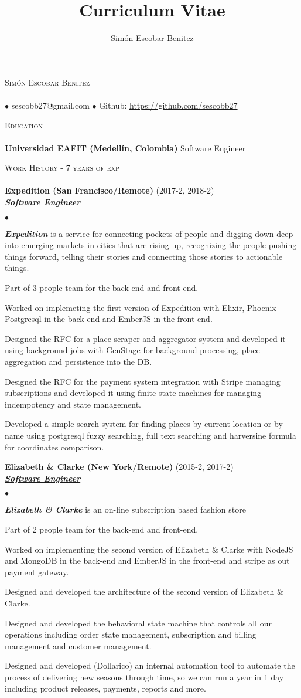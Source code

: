\documentclass[a4paper]{article}
\title{Curriculum Vitae}
\author{Sim\'on Escobar Benitez}
\newcommand{\lineunder}{\vspace*{-8pt} \\ \hspace*{-18pt} \hrulefill \\}
\newcommand{\header}[1]{{\hspace*{-15pt}\vspace*{6pt}
  \textsc{#1}} \vspace*{-6pt} \lineunder}
\newcommand{\employer}[3]{{
  \textbf{#1} (#2)\\ \underline{\textbf{\emph{#3}}}\\ }}
\newcommand{\contact}[2]{
  \vspace*{-8pt}
  \begin{center}
  {\LARGE \scshape {#1}} \lineunder #2
  \end{center}
  \vspace*{-8pt} }
\newenvironment{achievements}{\begin{list}{$\bullet$}{\topsep 0pt \itemsep
  -2pt}}{\vspace*{4pt}\end{list}}
\newcommand{\schoolwithcourses}[2]{
  \textbf{#1} #2
  \vspace*{5pt} }
\newcommand{\emphasys}[1]{\textbf{\emph{#1}}}
\begin{document}
  \small
  \smallskip
  \vspace*{-44pt}
  \contact{Sim\'on Escobar Benitez} { $\bullet$ sescobb27@gmail.com $\bullet$ Github: \url{https://github.com/sescobb27} }
  \header{Education}
  \schoolwithcourses{Universidad EAFIT (Medell\'in, Colombia)}{Software Engineer}

  \header{Work History - 7 years of exp}

  \employer{ Expedition (San Francisco/Remote)}{2017-2, 2018-2}{Software Engineer}
  \begin{achievements}
  \item \emphasys{Expedition} is a service for connecting pockets of people and digging down deep into emerging markets in cities that are rising up, recognizing the people pushing things forward, telling their stories and connecting those stories to actionable things.
  \item Part of 3 people team for the back-end and front-end.
  \item Worked on implemeting the first version of Expedition with Elixir, Phoenix Postgresql in the back-end and EmberJS in the front-end.
  \item Designed the RFC for a place scraper and aggregator system and developed it using  background jobs with GenStage for background processing, place aggregation and persistence into the DB.
  \item Designed the RFC for the payment system integration with Stripe managing subscriptions and developed it using finite state machines for managing indempotency and state management.
  \item Developed a simple search system for finding places by current location or by name using postgresql fuzzy searching, full text searching and harversine formula for coordinates comparison.
  \end{achievements}

  \employer{ Elizabeth \& Clarke (New York/Remote)}{2015-2, 2017-2}{Software Engineer}
  \begin{achievements}
  \item \emphasys{Elizabeth \& Clarke} is an on-line subscription based fashion store
  \item Part of 2 people team for the back-end and front-end.
  \item Worked on implementing the second version of Elizabeth \& Clarke with NodeJS and MongoDB in the back-end and EmberJS in the front-end and stripe as out payment gateway.
  \item Designed and developed the architecture of the second version of Elizabeth \& Clarke.
  \item Designed and developed the behavioral state machine that controls all our operations including order state management, subscription and billing management and customer management.
  \item Designed and developed (Dollarico) an internal automation tool to automate the process of delivering new seasons through time, so we can run a year in 1 day including product releases, payments, reports and more.
  \end{achievements}
\end{document}
